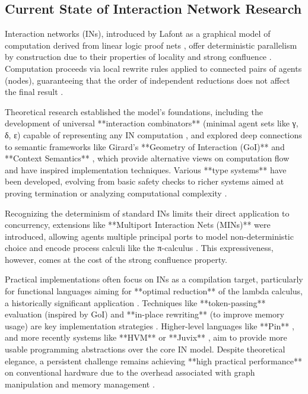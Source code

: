 \subsection{Current State of Interaction Network Research}
Interaction networks (INs), introduced by Lafont as a graphical model of computation derived from linear logic proof nets \cite{lafont1990interactionnets}, offer deterministic parallelism by construction due to their properties of locality and strong confluence \cite{Fernandez2010InteractionNets}. Computation proceeds via local rewrite rules applied to connected pairs of agents (nodes), guaranteeing that the order of independent reductions does not affect the final result \cite{Mackie1995InteractionNets}.

Theoretical research established the model's foundations, including the development of universal **interaction combinators** (minimal agent sets like {γ, δ, ε}) capable of representing any IN computation \cite{Lafont1995InteractionCombinators}, and explored deep connections to semantic frameworks like Girard's **Geometry of Interaction (GoI)** \cite{Girard1989GeometryInteraction} and **Context Semantics** \cite{Coquand1992ContextSemantics}, which provide alternative views on computation flow and have inspired implementation techniques. Various **type systems** have been developed, evolving from basic safety checks to richer systems aimed at proving termination or analyzing computational complexity \cite{Pinto2010TerminationInteraction, Ghilezan2014SizedTypes}.

Recognizing the determinism of standard INs limits their direct application to concurrency, extensions like **Multiport Interaction Nets (MINs)** were introduced, allowing agents multiple principal ports to model non-deterministic choice and encode process calculi like the π-calculus \cite{Fernandez2006MultiportInteraction}. This expressiveness, however, comes at the cost of the strong confluence property.

Practical implementations often focus on INs as a compilation target, particularly for functional languages aiming for **optimal reduction** of the lambda calculus, a historically significant application \cite{Asperti1999OptimalReduction}. Techniques like **token-passing** evaluation (inspired by GoI) and **in-place rewriting** (to improve memory usage) are key implementation strategies \cite{Mackie2006TokenPassing, vanOostrom2008InPlace}. Higher-level languages like **Pin** \cite{Asperti2002Pin}, and more recently systems like **HVM** \cite{HVMGithub} or **Juvix** \cite{JuvixGithub}, aim to provide more usable programming abstractions over the core IN model. Despite theoretical elegance, a persistent challenge remains achieving **high practical performance** on conventional hardware due to the overhead associated with graph manipulation and memory management \cite{Pinto2014InteractionNetsReview}.

